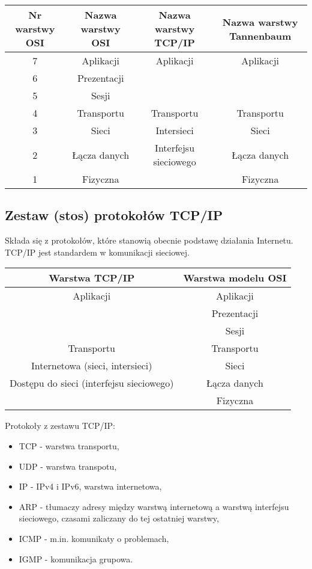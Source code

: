 \documentclass[../main.tex]{subfiles}
\begin{document}
    \begin{tabular}{|c|c|c|c| }
        \hline
        Nr warstwy OSI & Nazwa warstwy OSI & Nazwa warstwy TCP/IP & Nazwa warstwy Tannenbaum\\
        \hline
        7 & Aplikacji & Aplikacji & Aplikacji\\
        6 & Prezentacji & & \\
        5 & Sesji & & \\
        4 & Transportu & Transportu & Transportu\\
        3 & Sieci & Intersieci & Sieci\\
        2 & Łącza danych & Interfejsu sieciowego & Łącza danych\\
        1 & Fizyczna & & Fizyczna\\
        \hline
    \end{tabular}

    \subsection{Zestaw (stos) protokołów TCP/IP}
    Składa się z protokołów, które stanowią obecnie podstawę działania Internetu. TCP/IP jest standardem w komunikacji sieciowej.

    \begin{tabular}{|c|c|}
        \hline
        Warstwa TCP/IP & Warstwa modelu OSI\\
        \hline
        Aplikacji & Aplikacji\\
        & Prezentacji\\
        & Sesji\\
        \hline
        Transportu & Transportu\\
        \hline
        Internetowa (sieci, intersieci) & Sieci\\
        \hline
        Dostępu do sieci (interfejsu
        sieciowego) & Łącza danych\\
        & Fizyczna\\
        \hline
    \end{tabular}

    Protokoły z zestawu TCP/IP:
    \begin{itemize}
        \item TCP - warstwa transportu,
        \item UDP - warstwa transpotu,
        \item IP - IPv4 i IPv6, warstwa internetowa,
        \item ARP - tłumaczy adresy między warstwą internetową a warstwą interfejsu
        sieciowego, czasami zaliczany do tej ostatniej warstwy,
        \item ICMP - m.in. komunikaty o problemach,
        \item IGMP - komunikacja grupowa.
    \end{itemize}
\end{document}

